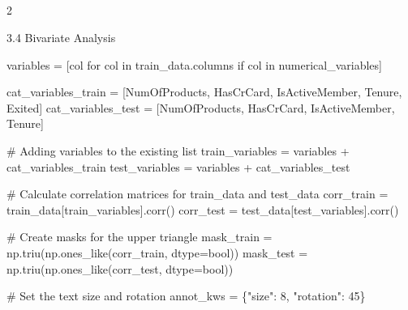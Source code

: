 \documentclass[
  letterpaper,
  DIV=11,
  numbers=noendperiod]{scrartcl}
\newenvironment{Shaded}{\begin{snugshade}}{\end{snugshade}}
\newcommand{\BuiltInTok}[1]{\textcolor[rgb]{0.00,0.23,0.31}{#1}}
\newcommand{\CommentTok}[1]{\textcolor[rgb]{0.37,0.37,0.37}{#1}}
\newcommand{\ControlFlowTok}[1]{\textcolor[rgb]{0.00,0.23,0.31}{#1}}
\newcommand{\DecValTok}[1]{\textcolor[rgb]{0.68,0.00,0.00}{#1}}
\newcommand{\KeywordTok}[1]{\textcolor[rgb]{0.00,0.23,0.31}{#1}}
\newcommand{\NormalTok}[1]{\textcolor[rgb]{0.00,0.23,0.31}{#1}}
\newcommand{\OperatorTok}[1]{\textcolor[rgb]{0.37,0.37,0.37}{#1}}
\newcommand{\StringTok}[1]{\textcolor[rgb]{0.13,0.47,0.30}{#1}}
\begin{document}
\hypertarget{section-8}{%
\subsection{}\label{section-8}}

2

3.4 Bivariate Analysis

\begin{Shaded}
\begin{Highlighting}[]
\NormalTok{variables }\OperatorTok{=}\NormalTok{ [col }\ControlFlowTok{for}\NormalTok{ col }\KeywordTok{in}\NormalTok{ train\_data.columns }\ControlFlowTok{if}\NormalTok{ col }\KeywordTok{in}\NormalTok{ numerical\_variables]}

\NormalTok{cat\_variables\_train }\OperatorTok{=}\NormalTok{ [}\StringTok{\textquotesingle{}NumOfProducts\textquotesingle{}}\NormalTok{, }\StringTok{\textquotesingle{}HasCrCard\textquotesingle{}}\NormalTok{, }\StringTok{\textquotesingle{}IsActiveMember\textquotesingle{}}\NormalTok{, }\StringTok{\textquotesingle{}Tenure\textquotesingle{}}\NormalTok{, }\StringTok{\textquotesingle{}Exited\textquotesingle{}}\NormalTok{]}
\NormalTok{cat\_variables\_test }\OperatorTok{=}\NormalTok{ [}\StringTok{\textquotesingle{}NumOfProducts\textquotesingle{}}\NormalTok{, }\StringTok{\textquotesingle{}HasCrCard\textquotesingle{}}\NormalTok{, }\StringTok{\textquotesingle{}IsActiveMember\textquotesingle{}}\NormalTok{, }\StringTok{\textquotesingle{}Tenure\textquotesingle{}}\NormalTok{]}

\CommentTok{\# Adding variables to the existing list}
\NormalTok{train\_variables }\OperatorTok{=}\NormalTok{ variables }\OperatorTok{+}\NormalTok{ cat\_variables\_train}
\NormalTok{test\_variables }\OperatorTok{=}\NormalTok{ variables }\OperatorTok{+}\NormalTok{ cat\_variables\_test}

\CommentTok{\# Calculate correlation matrices for train\_data and test\_data}
\NormalTok{corr\_train }\OperatorTok{=}\NormalTok{ train\_data[train\_variables].corr()}
\NormalTok{corr\_test }\OperatorTok{=}\NormalTok{ test\_data[test\_variables].corr()}

\CommentTok{\# Create masks for the upper triangle}
\NormalTok{mask\_train }\OperatorTok{=}\NormalTok{ np.triu(np.ones\_like(corr\_train, dtype}\OperatorTok{=}\BuiltInTok{bool}\NormalTok{))}
\NormalTok{mask\_test }\OperatorTok{=}\NormalTok{ np.triu(np.ones\_like(corr\_test, dtype}\OperatorTok{=}\BuiltInTok{bool}\NormalTok{))}

\CommentTok{\# Set the text size and rotation}
\NormalTok{annot\_kws }\OperatorTok{=}\NormalTok{ \{}\StringTok{"size"}\NormalTok{: }\DecValTok{8}\NormalTok{, }\StringTok{"rotation"}\NormalTok{: }\DecValTok{45}\NormalTok{\}}


\end{Highlighting}
\end{Shaded}
\end{document}
